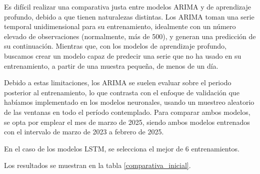 Es difícil realizar una comparativa justa entre modelos ARIMA y de aprendizaje profundo, debido a que tienen naturalezas distintas.
Los ARIMA toman una serie temporal unidimensional para su entrenamiento, idealmente con un número elevado de observaciones (normalmente, más de 500),
 y generan una predicción de su continuación. Mientras que, con los modelos de aprendizaje profundo, buscamos crear un modelo capaz de predecir
una serie que no ha usado en su entrenamiento, a partir de una muestra pequeña, de menos de un día.  


Debido a estas limitaciones, los ARIMA se suelen evaluar sobre el periodo posterior al entrenamiento, lo que contrasta con el enfoque de validación que habíamos implementado 
en los modelos neuronales, usando un muestreo aleatorio de las ventanas en todo el período contemplado.
Para comparar ambos modelos, se opta por emplear el mes de marzo de 2025, siendo ambos modelos entrenados con el intervalo de marzo de 2023 a febrero de 2025.  

En el caso de los modelos LSTM, se selecciona el mejor de 6 entrenamientos. 

Los resultados se muestran en la tabla \ref{comparativa_inicial}.

